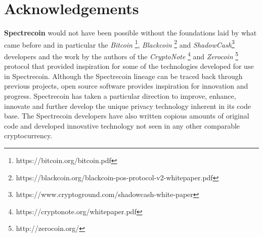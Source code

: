 \chapter{Acknowledgements}
\textbf{Spectrecoin} would not have been possible without the foundations
laid by what came before and in particular the \textit{Bitcoin}
\footnote{https://bitcoin.org/bitcoin.pdf}, \textit{Blackcoin}
\footnote{https://blackcoin.org/blackcoin-pos-protocol-v2-whitepaper.pdf}
and \textit{ShadowCash}\footnote{https://www.cryptoground.com/shadowcash-white-paper}
developers and the work by the authors of the \textit{CryptoNote}
\footnote{https://cryptonote.org/whitepaper.pdf} and \textit{Zerocoin}
\footnote{http://zerocoin.org/} protocol that provided inspiration for
some of the technologies developed for use in Spectrecoin. Although the
Spectrecoin lineage can be traced back through previous projects, open
source software provides inspiration for innovation and progress.
Spectrecoin has taken a particular direction to improve, enhance,
innovate and further develop the unique privacy technology inherent
in its code base. The Spectrecoin developers have also written copious
amounts of original code and developed innovative technology not seen
in any other comparable cryptocurrency.
